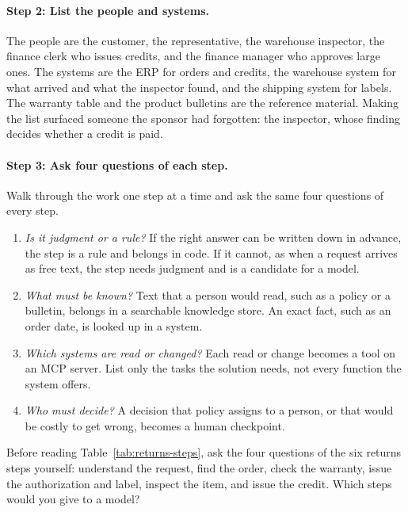 \paragraph{Step 2: List the people and systems.} The people are the customer, the representative, the warehouse inspector, the finance clerk who issues credits, and the finance manager who approves large ones. The systems are the ERP for orders and credits, the warehouse system for what arrived and what the inspector found, and the shipping system for labels. The warranty table and the product bulletins are the reference material. Making the list surfaced someone the sponsor had forgotten: the inspector, whose finding decides whether a credit is paid.

\paragraph{Step 3: Ask four questions of each step.} Walk through the work one step at a time and ask the same four questions of every step.
\begin{enumerate}[itemsep=2pt]
  \item \emph{Is it judgment or a rule?} If the right answer can be written down in advance, the step is a rule and belongs in code. If it cannot, as when a request arrives as free text, the step needs judgment and is a candidate for a model.
  \item \emph{What must be known?} Text that a person would read, such as a policy or a bulletin, belongs in a searchable knowledge store. An exact fact, such as an order date, is looked up in a system.
  \item \emph{Which systems are read or changed?} Each read or change becomes a tool on an MCP server. List only the tasks the solution needs, not every function the system offers.
  \item \emph{Who must decide?} A decision that policy assigns to a person, or that would be costly to get wrong, becomes a human checkpoint.
\end{enumerate}
\begin{tryit}
Before reading Table~\ref{tab:returns-steps}, ask the four questions of the six returns steps yourself: understand the request, find the order, check the warranty, issue the authorization and label, inspect the item, and issue the credit. Which steps would you give to a model?
\end{tryit}

